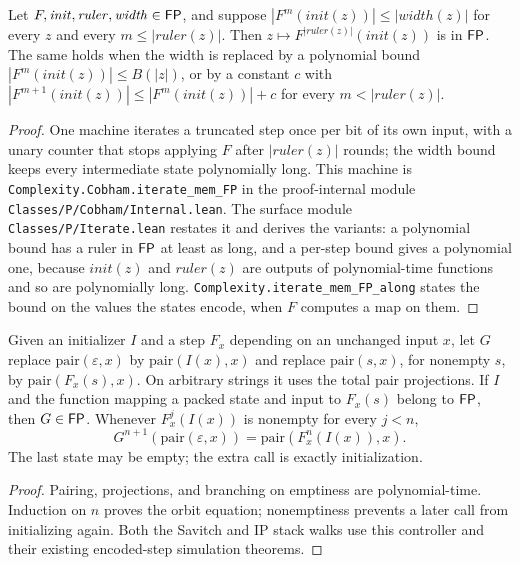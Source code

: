 \begin{lemma}[Iteration in $\cc{FP}$]
  \label{lem:polytime-iterate}
  \leanok
  Let $F, \mathit{init}, \mathit{ruler}, \mathit{width} \in \mathsf{FP}$, and
  suppose $|F^m(\mathit{init}(z))| \le |\mathit{width}(z)|$ for every $z$ and
  every $m \le |\mathit{ruler}(z)|$. Then
  $z \mapsto F^{|\mathit{ruler}(z)|}(\mathit{init}(z))$ is in $\cc{FP}$.
  The same holds when the width is replaced by a polynomial bound
  $|F^m(\mathit{init}(z))| \le B(|z|)$, or by a constant $c$ with
  $|F^{m+1}(\mathit{init}(z))| \le |F^m(\mathit{init}(z))| + c$ for every
  $m < |\mathit{ruler}(z)|$.
\end{lemma}
\begin{proof}
  \leanok
  One machine iterates a truncated step once per bit of its own input, with a
  unary counter that stops applying $F$ after $|\mathit{ruler}(z)|$ rounds;
  the width bound keeps every intermediate state polynomially long. This
  machine is \texttt{Complexity.Cobham.iterate\_mem\_FP} in the proof-internal
  module \texttt{Classes/P/Cobham/Internal.lean}. The surface module
  \texttt{Classes/P/Iterate.lean} restates it and derives the variants: a
  polynomial bound has a ruler in $\cc{FP}$ at least as long, and a per-step
  bound gives a polynomial one, because $\mathit{init}(z)$ and
  $\mathit{ruler}(z)$ are outputs of polynomial-time functions and so are
  polynomially long. \texttt{Complexity.iterate\_mem\_FP\_along} states the
  bound on the values the states encode, when $F$ computes a map on them.
\end{proof}

\begin{lemma}
  \label{lem:polytime-initialized-iterate}
  \leanok
  Given an initializer $I$ and a step $F_x$ depending on an unchanged input $x$,
  let $G$ replace $\mathrm{pair}(\varepsilon,x)$ by
  $\mathrm{pair}(I(x),x)$ and replace $\mathrm{pair}(s,x)$, for nonempty $s$,
  by $\mathrm{pair}(F_x(s),x)$. On arbitrary strings it uses the total pair
  projections. If $I$ and the function mapping a packed state and input to
  $F_x(s)$ belong to $\cc{FP}$, then $G \in \mathsf{FP}$. Whenever
  $F_x^j(I(x))$ is nonempty for every $j<n$,
  \[
    G^{n+1}(\mathrm{pair}(\varepsilon,x))
      = \mathrm{pair}(F_x^n(I(x)),x).
  \]
  The last state may be empty; the extra call is exactly initialization.
\end{lemma}
\begin{proof}
  \leanok
  Pairing, projections, and branching on emptiness are polynomial-time.
  Induction on $n$ proves the orbit equation; nonemptiness prevents a later
  call from initializing again. Both the Savitch and IP stack walks use this
  controller and their existing encoded-step simulation theorems.
\end{proof}

